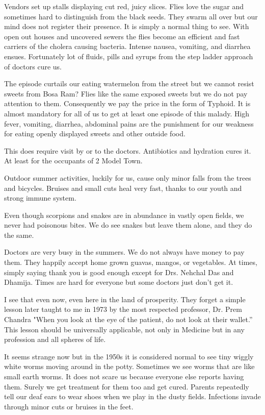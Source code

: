 Vendors set up stalls displaying cut red, juicy slices. Flies love the
sugar and sometimes hard to distinguish from the black seeds. They swarm
all over but our mind does not register their presence. It is simply
a normal thing to see. With open out houses and uncovered sewers the flies
become an efficient and fast carriers of the cholera causing bacteria.
Intense nausea, vomiting, and diarrhea ensues. Fortunately lot of fluids,
pills and syrups from the step ladder approach of doctors cure us. 

The episode curtails our eating watermelon from the street but we cannot
resist sweets from Bosa Ram? Flies like the same exposed sweets but we do
not pay attention to them. Consequently we pay the price in the form of
Typhoid. It is almost mandatory for all of us to get at least one episode
of this malady. High fever, vomiting, diarrhea, abdominal pains are the
punishment for our weakness for eating openly displayed sweets and other
outside food. 

This does require visit by or to the doctors. Antibiotics and hydration
cures it. At least for the occupants of 2 Model Town. 

Outdoor summer activities, luckily for us, cause only minor falls from the
trees and bicycles. Bruises and small cuts heal very fast, thanks to our
youth and strong immune system. 

Even though scorpions and snakes are in abundance in vastly open fields,
we never had poisonous bites. We do see snakes but leave them alone, and
they do the same. 

Doctors are very busy in the summers. We do not always have money to pay
them. They happily accept home grown guavas, mangos, or vegetables. At
times, simply saying thank you is good enough except for Drs. Nehchal Das
and Dhamija. Times are hard for everyone but some doctors just don’t get
it. 

I see that even now, even here in the land of prosperity. They forget
a simple lesson later taught to me in 1973 by the most respected
professor, Dr. Prem Chandra "When you look at the eye of the patient, do
not look at their wallet.” This lesson should be universally applicable,
not only in Medicine but in any profession and all spheres of life. 

It seems strange now but in the 1950s it is considered normal to see tiny
wiggly white worms moving around in the potty. Sometimes we see worms that
are like small earth worms. It does not scare us because everyone else
reports having them. Surely we get treatment for them too and get cured.
Parents repeatedly tell our deaf ears to wear shoes when we play in the
dusty fields. Infections invade through minor cuts or bruises in the feet. 

